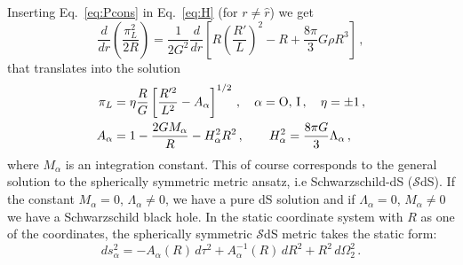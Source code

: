 \documentclass[11pt,a4paper]{article}
\begin{document}
Inserting Eq.~\eqref{eq:Pcons} in Eq.~\eqref{eq:H} (for $r\ne\hat{r}$)
we get 
\begin{equation}
\frac{d}{dr}\left(\frac{\pi_{L}^{2}}{2R}\right)=\frac{1}{2G^{2}}\frac{d}{dr}\left[R\left(\frac{R'}{L}\right)^{2}-R+\frac{8\pi}{3}G\rho R^{3}\right] \,,
\end{equation}
that translates into the solution
\begin{align}
\label{eq:pi_L}
\pi_{L} & = \eta\frac{R}{G}\left[\frac{R'^{2}}{L^{2}}-A_{\alpha}\right]^{1/2}\,, \quad  \alpha={\rm O}, \,{\rm I}\,, \quad \eta = \pm 1 \,,\\
\label{eq:Aalpha}
A_{\alpha} & = 1-\frac{2GM_{\alpha}}{R}-H_{\alpha}^{2}R^{2}\,, \qquad H_{\alpha}^{2}=\frac{8\pi G}{3}\Lambda_{\alpha} \,,
\end{align}
where $M_{\alpha}$ is an integration constant. This of course corresponds to the general solution to the spherically symmetric metric ansatz, i.e Schwarzschild-dS ($\mathcal{S}$dS). If the constant $M_{\alpha} = 0$, $\Lambda_{\alpha} \ne 0$, we have a pure dS solution and if $\Lambda_{\alpha} = 0$, $M_{\alpha} \ne 0$ we have a Schwarzschild black hole. In the static coordinate system with $R$ as one of the coordinates, the spherically symmetric $\mathcal{S}$dS metric takes the static form:
\begin{equation}
ds_\alpha^2=-A_\alpha(R)\, d\tau^2+A_\alpha^{-1}(R)\, dR^2 + R^2\, d\Omega_2^2 \,.
\end{equation}
\end{document}
